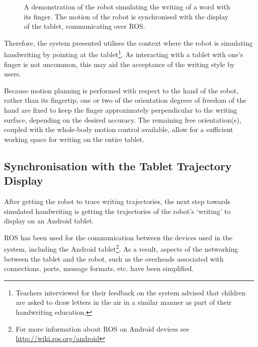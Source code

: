\documentclass{sig-alternate}
\begin{document}
\begin{figure}[thpb]
     \begin{center}
%
    \end{center}
    \caption{A demonstration of the robot simulating the writing of a word with
    its finger. The motion of the robot is synchronised with the display of the
    tablet, communicating over ROS.}%

   \label{fig:naoWriting}
\end{figure}

Therefore, the system presented utilises the context where the robot is
simulating handwriting by pointing at the tablet\footnote{Teachers interviewed
for their feedback on the system advised that children are asked to draw letters
in the air in a similar manner as part of their handwriting education.}. As
interacting with a tablet with one's finger is not uncommon, this may aid the
acceptance of the writing style by users. 

Because
motion planning is performed with respect to the hand of the robot, rather than
its fingertip, one or two of the orientation degrees of freedom of the hand
are fixed to keep the finger approximately perpendicular to the writing surface,
depending on the desired accuracy. The remaining free orientation(s), coupled
with the whole-body motion control available, allow for a sufficient working
space for writing on the entire tablet.

\subsection{Synchronisation with the Tablet Trajectory Display}\label{sec:tabletSynch}

After getting the robot to trace writing trajectories, the next step towards
simulated handwriting is getting the trajectories of the robot's `writing' to
display on an Android tablet. 

ROS has been used for the communication between the devices used in the system,
including the Android tablet\footnote{For more information about ROS on Android
devices see \url{http://wiki.ros.org/android}}. As a result, aspects of the
networking between the tablet and the robot, such as the overheads associated
with connections, ports, message formats, etc. have been simplified. 
\end{document}
